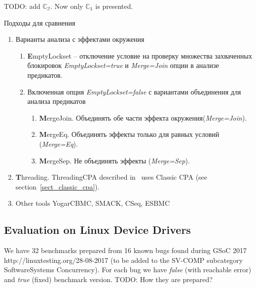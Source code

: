 TODO: add $\mathbb{C_2}$.
Now only $\mathbb{C_1}$ is presented.

Подходы для сравнения
\begin{enumerate}
\item Варианты анализа с эффектами окружения
\begin{enumerate}
\item {\textbf EmptyLockset} -- отключение условие на проверку множества захваченных блокировок {\em EmptyLockset=true} и {\em Merge=Join} опции в анализе предикатов.
\item Включенная опция {\em EmptyLockset=false} с вариантами объединения для анализа предикатов
\begin{enumerate}
\item {\textbf MergeJoin}. Объединять обе части эффекта окружения({\em Merge=Join}). 
\item {\textbf MergeEq}. Объединять эффекты только для равных условий ({\em Merge=Eq}).
\item {\textbf MergeSep}. Не объединять эффекты ({\em Merge=Sep}). 
\end{enumerate}
\end{enumerate}
\item {\textbf Threading}. ThreadingCPA
described in~\cite{MEMICS16-Multi-Threaded} uses Classic CPA (see section~\ref{sect_classic_cpa}).
\item Other tools YogarCBMC, SMACK, CSeq, ESBMC
\end{enumerate}

\subsection{Evaluation on Linux Device Drivers}
We have 32 benchmarks prepared from 16 known bugs found during GSoC 2017 http://linuxtesting.org/28-08-2017
(to be added to the SV-COMP subcategory SoftwareSystems Concurrency). For each bug we have {\em false} (with reachable error) and {\em true} (fixed) benchmark version. TODO: How they are prepared?

